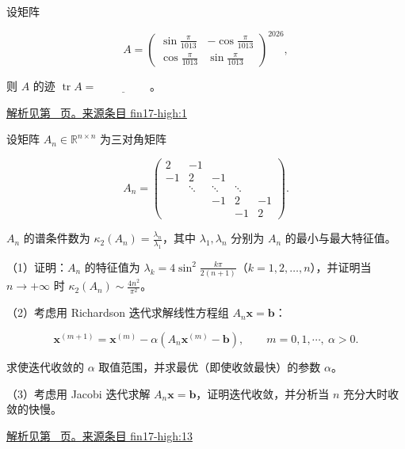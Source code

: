 \documentclass[12pt,fontset=fandol]{ctexart}
\begin{document}
\begin{example}\label{ex:fin17-high:1}

设矩阵

\[
A=
\begin{pmatrix}
\sin\frac{\pi}{1013} & -\cos\frac{\pi}{1013}\\
\cos\frac{\pi}{1013} & \sin\frac{\pi}{1013}
\end{pmatrix}^{2026},
\]

则 $A$ 的迹 $\operatorname{tr}A=\underline{\hspace{2cm}}$。

\par\hyperref[ans:fin17-high:1]{解析见第~\pageref{ans:fin17-high:1} 页。}\quad\href{https://github.com/lzxcr/cmc-mathematics/blob/64916fa1fdbc3e444a652eca204d5669058ee321/src/problems/finals/17/01.md}{来源条目 fin17-high:1}

\end{example}

\begin{example}\label{ex:fin17-high:13}

设矩阵 $A_n\in\mathbb R^{n\times n}$ 为三对角矩阵

\[
A_n=
\begin{pmatrix}
2 & -1 & & & \\
-1 & 2 & -1 & & \\
& \ddots & \ddots & \ddots & \\
& & -1 & 2 & -1\\
& & & -1 & 2
\end{pmatrix}.
\]

$A_n$ 的谱条件数为 $\kappa_2(A_n)=\frac{\lambda_n}{\lambda_1}$，其中 $\lambda_1,\lambda_n$ 分别为 $A_n$ 的最小与最大特征值。

（1）证明：$A_n$ 的特征值为 $\lambda_k=4\sin^2\frac{k\pi}{2(n+1)}$（$k=1,2,\dots,n$），并证明当 $n\to+\infty$ 时 $\kappa_2(A_n)\sim\frac{4n^2}{\pi^2}$。

（2）考虑用 Richardson 迭代求解线性方程组 $A_n\mathbf x=\mathbf b$：

\[
\mathbf x^{(m+1)}=\mathbf x^{(m)}-\alpha\left(A_n\mathbf x^{(m)}-\mathbf b\right),\qquad m=0,1,\cdots,\ \alpha>0 .
\]

求使迭代收敛的 $\alpha$ 取值范围，并求最优（即使收敛最快）的参数 $\alpha$。

（3）考虑用 Jacobi 迭代求解 $A_n\mathbf x=\mathbf b$，证明迭代收敛，并分析当 $n$ 充分大时收敛的快慢。

\par\hyperref[ans:fin17-high:13]{解析见第~\pageref{ans:fin17-high:13} 页。}\quad\href{https://github.com/lzxcr/cmc-mathematics/blob/64916fa1fdbc3e444a652eca204d5669058ee321/src/problems/finals/17/16.md}{来源条目 fin17-high:13}

\end{example}
\end{document}
